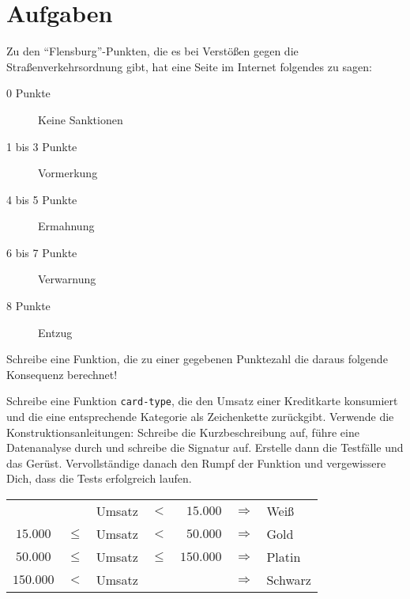 \section*{Aufgaben}

\begin{aufgabe}
Zu den "`Flensburg"'-Punkten, die es bei Verstößen gegen die
Straßenverkehrsordnung gibt, hat eine Seite im Internet folgendes zu
sagen:
%
\begin{description}
\item[0 Punkte] Keine Sanktionen
\item[1 bis 3 Punkte] Vormerkung
\item[4 bis 5 Punkte] Ermahnung
\item[6 bis 7 Punkte] Verwarnung
\item[8 Punkte] Entzug
\end{description}
%
Schreibe eine Funktion, die zu einer gegebenen Punktezahl die daraus
folgende Konsequenz berechnet!
\end{aufgabe}

\begin{aufgabe}
  Schreibe eine Funktion \texttt{card-type}, die den Umsatz einer
  Kreditkarte konsumiert und die eine entsprechende Kategorie als
  Zeichenkette zurückgibt.  Verwende die Konstruktionsanleitungen:
  Schreibe die Kurzbeschreibung auf, führe eine
  Datenanalyse durch und schreibe die Signatur auf. Erstelle
  dann die Testfälle und das Gerüst.  Vervollständige danach den
  Rumpf der Funktion und vergewissere Dich, dass die Tests
  erfolgreich laufen. \\

  \begin{tabular}{crlcrll}
    &        & Umsatz & $<$ & $15.000$   & $\Longrightarrow$ & Weiß \\
    $15.000$  & $\leq$ & Umsatz & $<$ & $50.000 $  & $\Longrightarrow$ & Gold \\
    $50.000$  & $\leq$ & Umsatz & $\leq$ & $150.000 $ 
    & $\Longrightarrow$ & Platin \\
    $150.000$ & $<$ & Umsatz &     &            &  $\Longrightarrow$ & Schwarz \\
  \end{tabular} \\
\end{aufgabe}

